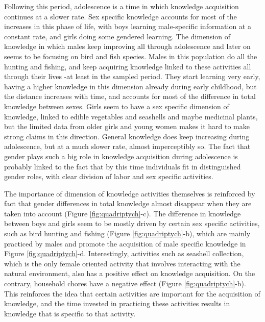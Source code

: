 Following this period, adolescence is a time in which knowledge acquisition continues at a slower rate. Sex specific knowledge accounts for most of the increases in this phase of life, with boys learning male-specific information at a constant rate, and girls doing some gendered learning. The dimension of knowledge in which males keep improving all through adolescence and later on seems to be focusing on bird and fish species. Males in this population do all the hunting and fishing, and keep acquiring knowledge linked to these activities all through their lives -at least in the sampled period. They start learning very early, having a higher knowledge in this dimension already during early childhood, but the distance increases with time, and accounts for most of the difference in total knowledge between sexes. Girls seem to have a sex specific dimension of knowledge, linked to edible vegetables and seashells and maybe medicinal plants, but the limited data from older girls and young women makes it hard to make strong claims in this direction. General knowledge does keep increasing during adolescence, but at a much slower rate, almost imperceptibly so. 
The fact that gender plays such a big role in knowledge acquisition during adolescence is probably linked to the fact that by this time individuals fit in distinguished gender roles, with clear division of labor and sex specific activities. 

The importance of dimension of knowledge activities themselves is reinforced by fact that gender differences in total knowledge almost disappear when they are taken into account (Figure \ref{fig:quadriptych}-c). The difference in knowledge between boys and girls seem to be mostly driven by certain sex specific activities, such as bird hunting and fishing (Figure \ref{fig:quadriptych}-b), which are mainly practiced by males and promote the acquisition of male specific knowledge in Figure \ref{fig:quadriptych}-d. Interestingly, activities such as seashell collection, which is the only female oriented activity that involves interacting with the natural environment, also has a positive effect on knowledge acquisition. On the contrary, household chores have a negative effect (Figure \ref{fig:quadriptych}-b). This reinforces the idea that certain activities are important for the acquisition of knowledge, and the time invested in practicing these activities results in knowledge that is specific to that activity. 

